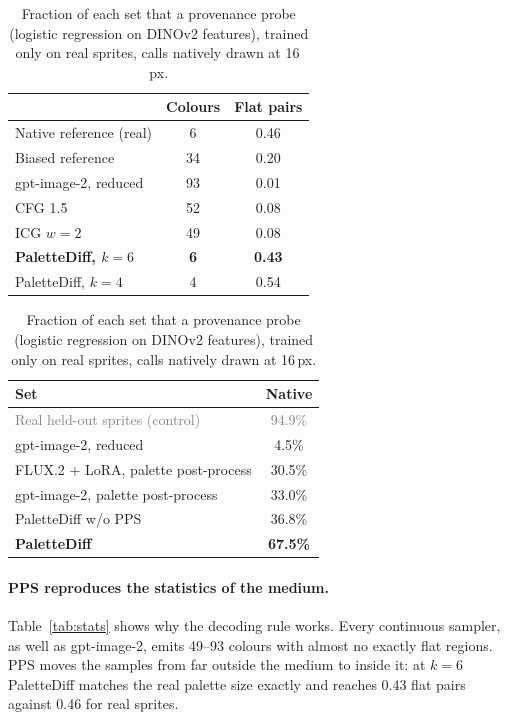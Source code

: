 \documentclass{article} %
\newcommand{\ours}{PaletteDiff}
\newcommand{\gray}[1]{\textcolor{gray}{#1}}
\begin{document}
\begin{table}[t]
\centering
\begin{minipage}[t]{0.48\linewidth}
\centering
\caption{Per-image statistics at 16\,px: median opaque colours and fraction of exactly equal adjacent opaque pixels.}
\label{tab:stats}
\small
\begin{tabular}{@{}lcc@{}}
\toprule
& Colours & Flat pairs \\
\midrule
Native reference (real)     & 6  & 0.46 \\
Biased reference            & 34 & 0.20 \\
\midrule
gpt-image-2, reduced        & 93 & 0.01 \\
CFG 1.5                     & 52 & 0.08 \\
ICG $w{=}2$                 & 49 & 0.08 \\
\textbf{\ours{}, $k{=}6$}   & \textbf{6} & \textbf{0.43} \\
\ours{}, $k{=}4$            & 4  & 0.54 \\
\bottomrule
\end{tabular}
\end{minipage}\hfill
\begin{minipage}[t]{0.49\linewidth}
\centering
\caption{Fraction of each set that a provenance probe (logistic regression on DINOv2 features), trained only on real
sprites, calls natively drawn at 16\,px.}
\label{tab:probe}
\small
\begin{tabular}{@{}lc@{}}
\toprule
Set & Native \\
\midrule
\gray{Real held-out sprites (control)}  & \gray{94.9\%} \\
\midrule
gpt-image-2, reduced                    & 4.5\% \\
FLUX.2 + LoRA, palette post-process     & 30.5\% \\
gpt-image-2, palette post-process       & 33.0\% \\
\ours{} w/o PPS                         & 36.8\% \\
\textbf{\ours{}}                        & \textbf{67.5\%} \\
\bottomrule
\end{tabular}
\end{minipage}
\end{table}

\paragraph{PPS reproduces the statistics of the medium.}
Table~\ref{tab:stats} shows why the decoding rule works. Every continuous sampler, as well as gpt-image-2, emits 49--93
colours with almost no exactly flat regions. PPS moves the samples from far outside the medium to inside it: at $k=6$
\ours{} matches the real palette size exactly and reaches 0.43 flat pairs against 0.46 for real sprites.
\end{document}
